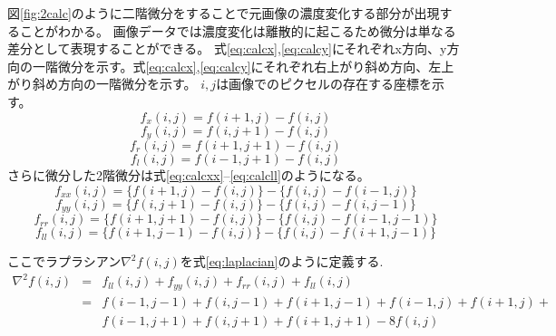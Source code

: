 \documentclass[11pt,a4paper,titlepage,dvipdfmx]{jarticle}
\begin{document}
    図\ref{fig:2calc}のように二階微分をすることで元画像の濃度変化する部分が出現することがわかる。
    画像データでは濃度変化は離散的に起こるため微分は単なる差分として表現することができる。
    式\eqref{eq:calcx},\eqref{eq:calcy}にそれぞれx方向、y方向の一階微分を示す。式\eqref{eq:calcx},\eqref{eq:calcy}にそれぞれ右上がり斜め方向、左上がり斜め方向の一階微分を示す。
    $i,j$は画像でのピクセルの存在する座標を示す。
    \begin{equation}\label{eq:calcx}
      f_x(i, j) = f(i + 1, j) - f(i, j)   
    \end{equation}
    \begin{equation}\label{eq:calcy}
      f_y(i, j) = f(i, j + 1) - f(i, j)   
    \end{equation}
    \begin{equation}\label{eq:calcr}
      f_r(i, j) = f(i + 1, j + 1) - f(i, j)   
    \end{equation}
    \begin{equation}\label{eq:calcl}
      f_l(i, j) = f(i - 1, j + 1) - f(i, j)   
    \end{equation}
    さらに微分した2階微分は式\eqref{eq:calcxx}--\eqref{eq:calcll}のようになる。
    \begin{equation}\label{eq:calcxx}
      f_{xx}(i, j) = \{f(i + 1, j) - f(i, j)\} - \{f(i, j) - f(i - 1,j)\}  
    \end{equation}
    \begin{equation}\label{eq:calcyy}
      f_{yy}(i, j) = \{f(i, j + 1) - f(i, j)\} - \{f(i, j) - f(i, j - 1)\}  
    \end{equation}
    \begin{equation}\label{eq:calcrr}
      f_{rr}(i, j) = \{f(i + 1, j + 1) - f(i, j)\} - \{f(i, j) - f(i - 1, j - 1)\}  
    \end{equation}
    \begin{equation}\label{eq:calcll}
      f_{ll}(i, j) = \{f(i + 1, j - 1) - f(i, j)\} - \{f(i, j) - f(i + 1, j - 1)\}  
    \end{equation}

    ここでラプラシアン$\nabla^2f(i,j)$を式\eqref{eq:laplacian}のように定義する.
    \begin{eqnarray}\label{eq:laplacian}
      \nabla^2f(i, j) &=& f_{ll}(i, j) + f_{yy}(i, j) +f_{rr}(i, j) +f_{ll}(i, j) \nonumber \\
      &=& f(i - 1, j- 1)  + f(i, j - 1) + f(i + 1, j - 1) + f(i - 1, j) + f(i + 1, j) + \nonumber\\
      &&f(i - 1, j + 1) + f(i, j + 1) + f(i + 1, j + 1) - 8f(i,j)
    \end{eqnarray}
\end{document}
